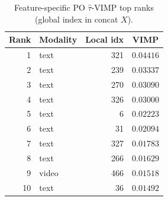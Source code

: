 \begin{table}[ht]
\centering
\caption{Feature-specific PO $\widehat\tau$-VIMP top ranks (global index in concat $X$).}
\label{tab:msrvtt-feat-vimp}
\small
\begin{tabular}{@{}r l r c@{}}
\toprule
Rank & Modality & Local idx & VIMP \\
\midrule
1 & text & 321 & $0.04416$ \\
2 & text & 239 & $0.03337$ \\
3 & text & 270 & $0.03090$ \\
4 & text & 326 & $0.03000$ \\
5 & text & 6 & $0.02223$ \\
6 & text & 31 & $0.02094$ \\
7 & text & 327 & $0.01783$ \\
8 & text & 266 & $0.01629$ \\
9 & video & 466 & $0.01518$ \\
10 & text & 36 & $0.01492$ \\
\bottomrule
\end{tabular}
\end{table}
